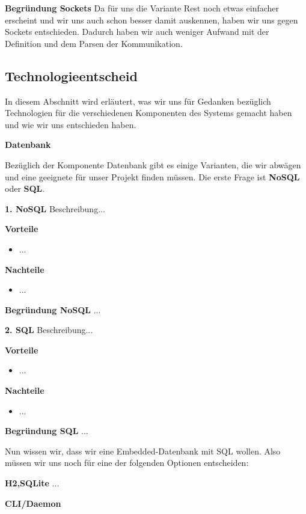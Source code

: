 \documentclass[a4paper,12pt]{report}
\begin{document}
    \textbf{Begründung Sockets} Da für uns die Variante Rest noch etwas einfacher erscheint und wir uns auch schon besser
    damit auskennen, haben wir uns gegen Sockets entschieden.
    Dadurch haben wir auch weniger Aufwand mit der Definition und dem Parsen der Kommunikation.

    \subsection{Technologieentscheid}
    In diesem Abschnitt wird erläutert, was wir uns für Gedanken bezüglich Technologien für die verschiedenen Komponenten
    des Systems gemacht haben und wie wir uns entschieden haben.

        {\large\bfseries Datenbank}

    Bezüglich der Komponente Datenbank gibt es einige Varianten, die wir abwägen und eine geeignete für unser Projekt finden müssen.
    Die erste Frage ist \textbf{NoSQL} oder \textbf{SQL}.

    \textbf{1. NoSQL}
    Beschreibung...

    \textbf{Vorteile}
    \begin{itemize}
        \item ...
    \end{itemize}

    \textbf{Nachteile}
    \begin{itemize}
        \item ...
    \end{itemize}

    \textbf{Begründung NoSQL} ...

    \textbf{2. SQL}
    Beschreibung...

    \textbf{Vorteile}
    \begin{itemize}
        \item ...
    \end{itemize}

    \textbf{Nachteile}
    \begin{itemize}
        \item ...
    \end{itemize}

    \textbf{Begründung SQL} ...

    Nun wissen wir, dass wir eine Embedded-Datenbank mit SQL wollen.
    Also müssen wir uns noch für eine der folgenden Optionen entscheiden:

    \textbf{H2,SQLite} ...

        {\large\bfseries CLI/Daemon}
\end{document}
